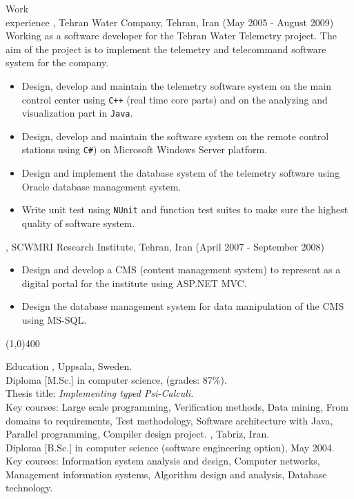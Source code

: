 \documentclass{resume}
\begin{document}
\begin{category}{Work \\experience}
, Tehran Water Company, Tehran, Iran (May 2005 - August 2009)\\
Working as a software developer for the Tehran Water Telemetry project. The aim of the 
project is to implement the telemetry and telecommand software system for the company.
\begin{itemize}
 \item Design, develop and maintain the telemetry software system on the main control center using 
       \texttt{C++} (real time core parts) and on the analyzing and visualization part in \texttt{Java}.
 \item Design, develop and maintain the software system on the remote control stations using \texttt{C\#})
       on Microsoft Windows Server platform.
 \item Design and implement the database system of the telemetry software 
       using Oracle database management system.
 \item Write unit test using \texttt{NUnit} and function test suites to make sure the 
       highest quality of software system. 
\end{itemize}

, SCWMRI Research Institute, 
Tehran, Iran (April 2007 - September 2008)
\begin{itemize} 
\item Design and develop a CMS (content management system) to represent as a 
      digital portal for the institute using ASP.NET MVC.
\item Design the database management system for data manipulation of the CMS using MS-SQL.
\end{itemize}

\end{category}

\begin{center}
\line(1,0){400}
\end{center}

\begin{category}{Education}
, Uppsala, Sweden. \\
Diploma [M.Sc.] in computer science, (grades: 87\%).\\
Thesis title: {\em Implementing typed Psi-Calculi.}\\
Key courses: Large scale programming, Verification methods, Data mining, 
From domains to requirements, Test methodology,
Software architecture with Java, Parallel programming, Compiler design project. 
, Tabriz, Iran.\\
Diploma [B.Sc.] in computer science (software engineering option), May 2004.\\
Key courses: Information system analysis and design, Computer networks, 
Management information systems, Algorithm design and analysis, Database technology.

\end{category}
\end{document}

